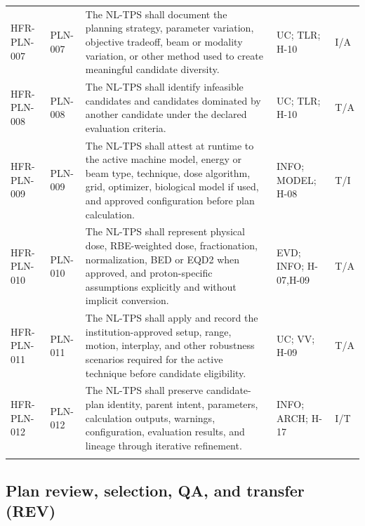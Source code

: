 \documentclass[11pt,letterpaper]{article}
\begin{document}
\begin{scriptsize}
\begin{longtable}{@{}L{0.14\textwidth}L{0.09\textwidth}L{0.47\textwidth}L{0.15\textwidth}L{0.07\textwidth}@{}}
\addlinespace[2pt]
\mbox{HFR-PLN-007} & \mbox{PLN-007} & The NL-TPS shall document the planning strategy, parameter variation, objective tradeoff, beam or modality variation, or other method used to create meaningful candidate diversity. & UC; TLR; H-10 & I\slash\allowbreak{}A \\
\addlinespace[2pt]
\mbox{HFR-PLN-008} & \mbox{PLN-008} & The NL-TPS shall identify infeasible candidates and candidates dominated by another candidate under the declared evaluation criteria. & UC; TLR; H-10 & T\slash\allowbreak{}A \\
\addlinespace[2pt]
\mbox{HFR-PLN-009} & \mbox{PLN-009} & The NL-TPS shall attest at runtime to the active machine model, energy or beam type, technique, dose algorithm, grid, optimizer, biological model if used, and approved configuration before plan calculation. & INFO; MODEL; H-08 & T\slash\allowbreak{}I \\
\addlinespace[2pt]
\mbox{HFR-PLN-010} & \mbox{PLN-010} & The NL-TPS shall represent physical dose, RBE-weighted dose, fractionation, normalization, BED or EQD2 when approved, and proton-specific assumptions explicitly and without implicit conversion. & EVD; INFO; H-07,H-09 & T\slash\allowbreak{}A \\
\addlinespace[2pt]
\mbox{HFR-PLN-011} & \mbox{PLN-011} & The NL-TPS shall apply and record the institution-approved setup, range, motion, interplay, and other robustness scenarios required for the active technique before candidate eligibility. & UC; VV; H-09 & T\slash\allowbreak{}A \\
\addlinespace[2pt]
\mbox{HFR-PLN-012} & \mbox{PLN-012} & The NL-TPS shall preserve candidate-plan identity, parent intent, parameters, calculation outputs, warnings, configuration, evaluation results, and lineage through iterative refinement. & INFO; ARCH; H-17 & I\slash\allowbreak{}T \\
\addlinespace[2pt]
\end{longtable}
\end{scriptsize}

\subsection{Plan review, selection, QA, and transfer (REV)}
\end{document}
